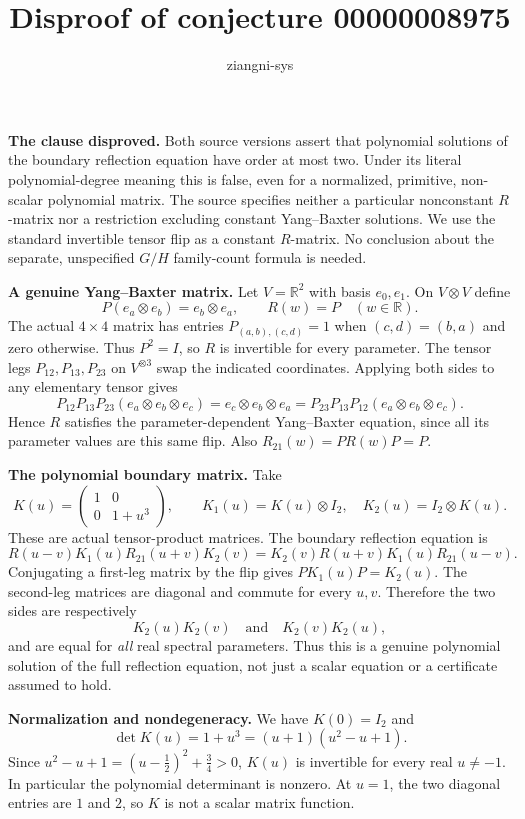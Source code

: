 \documentclass[11pt]{article}
\title{Disproof of conjecture 00000008975}
\author{ziangni-sys}
\date{}
\begin{document}
\maketitle
\noindent\textbf{The clause disproved.}
Both source versions assert that polynomial solutions of the boundary reflection equation have order at most two. Under its literal polynomial-degree meaning this is false, even for a normalized, primitive, non-scalar polynomial matrix. The source specifies neither a particular nonconstant $R$-matrix nor a restriction excluding constant Yang--Baxter solutions. We use the standard invertible tensor flip as a constant $R$-matrix. No conclusion about the separate, unspecified $G/H$ family-count formula is needed.

\medskip
\noindent\textbf{A genuine Yang--Baxter matrix.}
Let $V=\mathbb R^2$ with basis $e_0,e_1$. On $V\otimes V$ define
\[
 P(e_a\otimes e_b)=e_b\otimes e_a,\qquad R(w)=P
 \quad(w\in\mathbb R).
\]
The actual $4\times4$ matrix has entries
$P_{(a,b),(c,d)}=1$ when $(c,d)=(b,a)$ and zero otherwise.
Thus $P^2=I$, so $R$ is invertible for every parameter.
The tensor legs $P_{12},P_{13},P_{23}$ on $V^{\otimes3}$ swap the indicated coordinates. Applying both sides to any elementary tensor gives
\[
 P_{12}P_{13}P_{23}(e_a\otimes e_b\otimes e_c)
 =e_c\otimes e_b\otimes e_a
 =P_{23}P_{13}P_{12}(e_a\otimes e_b\otimes e_c).
\]
Hence $R$ satisfies the parameter-dependent Yang--Baxter equation, since all its parameter values are this same flip. Also
$R_{21}(w)=P R(w)P=P$.

\medskip
\noindent\textbf{The polynomial boundary matrix.}
Take
\[
 K(u)=\begin{pmatrix}1&0\\0&1+u^3\end{pmatrix},
 \qquad
 K_1(u)=K(u)\otimes I_2,\quad K_2(u)=I_2\otimes K(u).
\]
These are actual tensor-product matrices. The boundary reflection equation is
\[
 R(u-v)K_1(u)R_{21}(u+v)K_2(v)
 =
 K_2(v)R(u+v)K_1(u)R_{21}(u-v).
\]
Conjugating a first-leg matrix by the flip gives
$P K_1(u)P=K_2(u)$. The second-leg matrices are diagonal and commute for every $u,v$. Therefore the two sides are respectively
\[
 K_2(u)K_2(v)\quad\text{and}\quad K_2(v)K_2(u),
\]
and are equal for \emph{all} real spectral parameters. Thus this is a genuine polynomial solution of the full reflection equation, not just a scalar equation or a certificate assumed to hold.

\medskip
\noindent\textbf{Normalization and nondegeneracy.}
We have $K(0)=I_2$ and
\[
 \det K(u)=1+u^3=(u+1)(u^2-u+1).
\]
Since $u^2-u+1=(u-\tfrac12)^2+\tfrac34>0$, $K(u)$ is invertible for every real $u\ne-1$. In particular the polynomial determinant is nonzero. At $u=1$, the two diagonal entries are $1$ and $2$, so $K$ is not a scalar matrix function.
\end{document}
